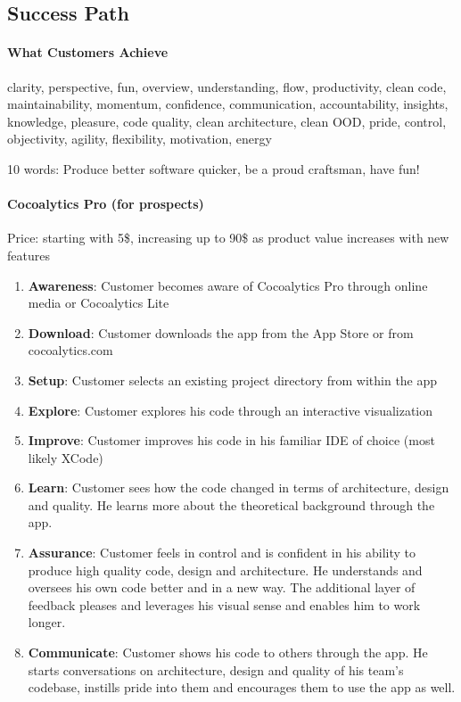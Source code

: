 \documentclass{article}
\begin{document}
\subsection{Success Path}

\paragraph{What Customers Achieve} clarity, perspective, fun, overview, understanding, flow, productivity, clean code, maintainability, momentum, confidence, communication, accountability, insights, knowledge, pleasure, code quality, clean architecture, clean OOD, pride, control, objectivity, agility, flexibility, motivation, energy

10 words: Produce better software quicker, be a proud craftsman, have fun!

\paragraph{Cocoalytics Pro (for prospects)} Price: starting with 5\$, increasing up to 90\$ as product value increases with new features

\begin{enumerate}
	\item \textbf{Awareness}: Customer becomes aware of Cocoalytics Pro through online media or Cocoalytics Lite
	\item \textbf{Download}: Customer downloads the app from the App Store or from cocoalytics.com
	\item \textbf{Setup}: Customer selects an existing project directory from within the app
	\item \textbf{Explore}: Customer explores his  code through an interactive visualization
	\item \textbf{Improve}: Customer improves his code in his familiar IDE of choice (most likely XCode)
	\item \textbf{Learn}: Customer sees how the code changed in terms of architecture, design and quality. He learns more about the theoretical background through the app. 
	\item \textbf{Assurance}: Customer feels in control and is confident in his ability to produce high quality code, design and architecture. He understands and oversees his own code better and in a new way. The additional layer of feedback pleases and leverages his visual sense and enables him to work longer.
	\item \textbf{Communicate}: Customer shows his code to others through the app. He starts conversations on architecture, design and quality of his team's codebase, instills pride into them and encourages them to use the app as well.
\end{enumerate}
\end{document}
